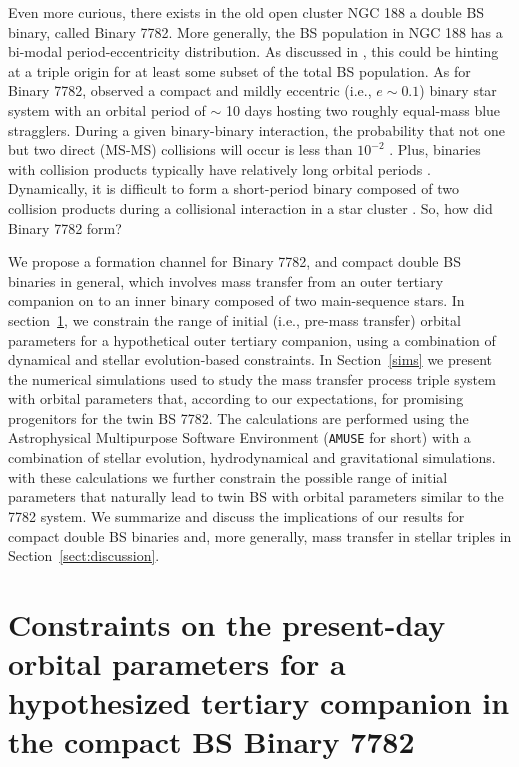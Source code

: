 \documentclass{aastex62}
\begin{document}
Even more curious, there exists in the old open cluster NGC 188 a
double BS binary, called Binary 7782.  More generally, the BS
population in NGC 188 has a bi-modal period-eccentricity distribution.
As discussed in \citet{2011MNRAS.410.2370L}, this could be hinting at
a triple origin for at least some subset of the total BS population.
As for Binary 7782, \citet{2009Natur.462.1032M} observed a compact and
mildly eccentric (i.e., $e \sim 0.1$) binary star system with an
orbital period of $\sim$ 10 days hosting two roughly equal-mass blue
stragglers.  During a given binary-binary interaction, the probability
that not one but two direct (MS-MS) collisions will occur is less than
$10^{-2}$
\citep{1989AJ.....98..217L,2011MNRAS.410.2370L,2012MNRAS.425.2369L}.
Plus, binaries with collision products typically have relatively long
orbital periods \cite{2011Sci...334.1380F}. Dynamically, it is
difficult to form a short-period binary composed of two collision
products during a collisional interaction in a star cluster
\citep{2011Sci...334.1380F}.  So, how did Binary 7782 form?

We propose a formation channel for Binary 7782, and compact double BS
binaries in general, which involves mass transfer from an outer
tertiary companion on to an inner binary composed of two main-sequence
stars.  In section~\ref{sect:dyn}, we constrain the range of initial
(i.e., pre-mass transfer) orbital parameters for a hypothetical outer
tertiary companion, using a combination of dynamical and stellar
evolution-based constraints.  In Section~\ref{sims} we present the
numerical simulations used to study the mass transfer process triple
system with orbital parameters that, according to our expectations,
for promising progenitors for the twin BS 7782.  The calculations are
performed using the Astrophysical Multipurpose Software Environment
(\texttt{AMUSE} for short) \cite{AMUSE} with a combination of stellar
evolution, hydrodynamical and gravitational simulations.  with these
calculations we further constrain the possible range of initial
parameters that naturally lead to twin BS with orbital parameters
similar to the 7782 system.  We summarize and discuss the implications
of our results for compact double BS binaries and, more generally,
mass transfer in stellar triples in Section~\ref{sect:discussion}.

\section{Constraints on the present-day orbital parameters for a hypothesized
         tertiary companion in the compact BS Binary 7782} \label{sect:dyn}
\end{document}
